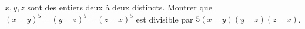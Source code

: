 $x, y, z$ sont des entiers deux à deux distincts. Montrer que $(x - y)^5 + (y - z)^5 + (z - x)^5$ est divisible par $5(x - y)(y - z)(z - x)$.
